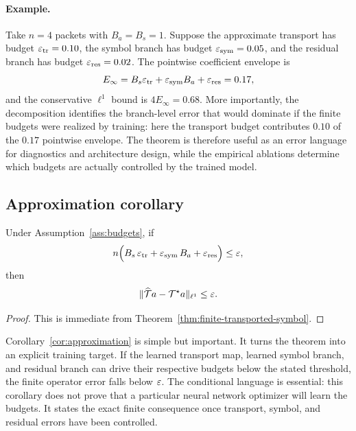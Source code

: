 \paragraph{Example.}
Take $n=4$ packets with $B_a=B_s=1$. Suppose the approximate transport has budget $\varepsilon_{\mathrm{tr}}=0.10$, the symbol branch has budget $\varepsilon_{\mathrm{sym}}=0.05$, and the residual branch has budget $\varepsilon_{\mathrm{res}}=0.02$. The pointwise coefficient envelope is
\[
E_\infty
=
B_s\varepsilon_{\mathrm{tr}}+\varepsilon_{\mathrm{sym}}B_a+\varepsilon_{\mathrm{res}}
=
0.17,
\]
and the conservative $\ell^1$ bound is $4E_\infty=0.68$. More importantly, the decomposition identifies the branch-level error that would dominate if the finite budgets were realized by training: here the transport budget contributes $0.10$ of the $0.17$ pointwise envelope. The theorem is therefore useful as an error language for diagnostics and architecture design, while the empirical ablations determine which budgets are actually controlled by the trained model.

\subsection{Approximation corollary}

\begin{corollary}
\label{cor:approximation}
Under Assumption~\ref{ass:budgets}, if
\[
n\Bigl(B_s\,\varepsilon_{\mathrm{tr}} + \varepsilon_{\mathrm{sym}}\,B_a + \varepsilon_{\mathrm{res}}\Bigr)\le \varepsilon,
\]
then
\[
\|\widehat{\mathcal T}a - \mathcal T^\star a\|_{\ell^1}\le \varepsilon.
\]
\end{corollary}

\begin{proof}
This is immediate from Theorem~\ref{thm:finite-transported-symbol}.
\end{proof}

Corollary~\ref{cor:approximation} is simple but important. It turns the theorem into an explicit training target. If the learned transport map, learned symbol branch, and residual branch can drive their respective budgets below the stated threshold, the finite operator error falls below $\varepsilon$. The conditional language is essential: this corollary does not prove that a particular neural network optimizer will learn the budgets. It states the exact finite consequence once transport, symbol, and residual errors have been controlled.


